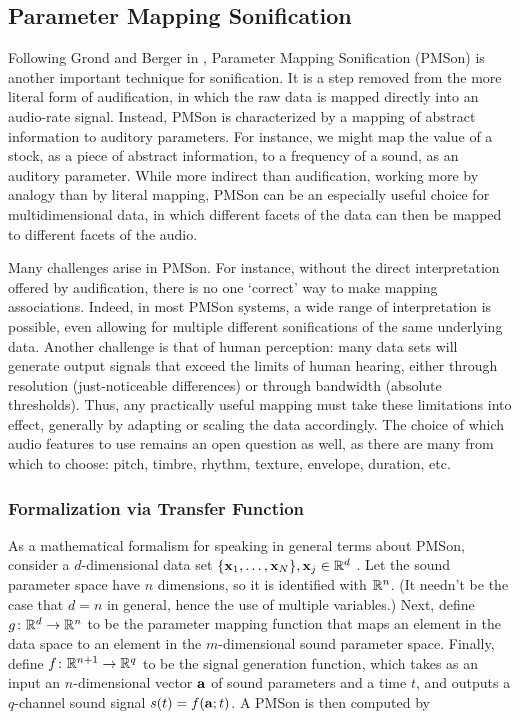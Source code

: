 \subsection{Parameter Mapping Sonification}
\label{sec:PMSon}
Following Grond and Berger in \cite{hermann2011sonification}, Parameter Mapping Sonification (PMSon) is another important technique for 
sonification. It is a step removed from the more literal form of 
audification, in which the raw data is mapped directly into an audio-rate 
signal. Instead, PMSon is characterized by a mapping of abstract information 
to auditory parameters. For instance, we might map the value of a stock, as a 
piece of abstract information, to a frequency of a sound, as an auditory 
parameter. While more indirect than audification, working more by analogy 
than by literal mapping, PMSon can be an especially useful choice for 
multidimensional data, in which different facets of the data can then be 
mapped to different facets of the audio.

Many challenges arise in PMSon. For instance, without the direct 
interpretation offered by audification, there is no one `correct' way to make 
mapping associations. Indeed, in most PMSon systems, a wide range of 
interpretation is possible, even allowing for multiple different 
sonifications of the same underlying data. Another challenge is that of human 
perception: many data sets will generate output signals that exceed the 
limits of human hearing, either through resolution (just-noticeable 
differences) or through bandwidth (absolute thresholds). Thus, any 
practically useful mapping must take these limitations into effect, generally 
by adapting or scaling the data accordingly. The choice of which audio 
features to use remains an open question as well, as there are many from 
which to choose: pitch, timbre, rhythm, texture, envelope, duration, etc. 

\subsubsection{Formalization via Transfer Function}
As a mathematical formalism for speaking in general terms about PMSon, 
consider a $d$-dimensional data set $\{\mathbf{x}_1, \dots, \mathbf{x}_N\}, \mathbf{x}_j \in \mathbb{R}^d$
. Let the sound parameter space have $n$ dimensions, so it is identified with 
$\mathbb{R}^n$. (It needn't be the case that $d = n$ in general, hence the use of 
multiple variables.) Next, define $g \colon \mathbb{R}^d \rightarrow \mathbb{R}^n$ to be the 
parameter mapping function that maps an element in the data space to an 
element in the $m$-dimensional sound parameter space.  Finally, define $f 
\colon \mathbb{R}^{n + 1} \rightarrow \mathbb{R}^q$ to be the signal generation function, 
which takes as an input an $n$-dimensional vector $\mathbf{a}$ of sound parameters 
and a time $t$, and outputs a $q$-channel sound signal $s(t) = f(\mathbf{a}; t)$. A 
PMSon is then computed by

